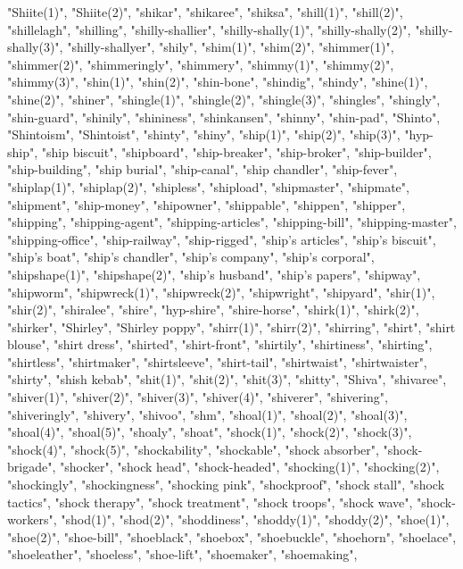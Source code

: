 "Shiite(1)",
"Shiite(2)",
"shikar",
"shikaree",
"shiksa",
"shill(1)",
"shill(2)",
"shillelagh",
"shilling",
"shilly-shallier",
"shilly-shally(1)",
"shilly-shally(2)",
"shilly-shally(3)",
"shilly-shallyer",
"shily",
"shim(1)",
"shim(2)",
"shimmer(1)",
"shimmer(2)",
"shimmeringly",
"shimmery",
"shimmy(1)",
"shimmy(2)",
"shimmy(3)",
"shin(1)",
"shin(2)",
"shin-bone",
"shindig",
"shindy",
"shine(1)",
"shine(2)",
"shiner",
"shingle(1)",
"shingle(2)",
"shingle(3)",
"shingles",
"shingly",
"shin-guard",
"shinily",
"shininess",
"shinkansen",
"shinny",
"shin-pad",
"Shinto",
"Shintoism",
"Shintoist",
"shinty",
"shiny",
"ship(1)",
"ship(2)",
"ship(3)",
"hyp-ship",
"ship biscuit",
"shipboard",
"ship-breaker",
"ship-broker",
"ship-builder",
"ship-building",
"ship burial",
"ship-canal",
"ship chandler",
"ship-fever",
"shiplap(1)",
"shiplap(2)",
"shipless",
"shipload",
"shipmaster",
"shipmate",
"shipment",
"ship-money",
"shipowner",
"shippable",
"shippen",
"shipper",
"shipping",
"shipping-agent",
"shipping-articles",
"shipping-bill",
"shipping-master",
"shipping-office",
"ship-railway",
"ship-rigged",
"ship's articles",
"ship's biscuit",
"ship's boat",
"ship's chandler",
"ship's company",
"ship's corporal",
"shipshape(1)",
"shipshape(2)",
"ship's husband",
"ship's papers",
"shipway",
"shipworm",
"shipwreck(1)",
"shipwreck(2)",
"shipwright",
"shipyard",
"shir(1)",
"shir(2)",
"shiralee",
"shire",
"hyp-shire",
"shire-horse",
"shirk(1)",
"shirk(2)",
"shirker",
"Shirley",
"Shirley poppy",
"shirr(1)",
"shirr(2)",
"shirring",
"shirt",
"shirt blouse",
"shirt dress",
"shirted",
"shirt-front",
"shirtily",
"shirtiness",
"shirting",
"shirtless",
"shirtmaker",
"shirtsleeve",
"shirt-tail",
"shirtwaist",
"shirtwaister",
"shirty",
"shish kebab",
"shit(1)",
"shit(2)",
"shit(3)",
"shitty",
"Shiva",
"shivaree",
"shiver(1)",
"shiver(2)",
"shiver(3)",
"shiver(4)",
"shiverer",
"shivering",
"shiveringly",
"shivery",
"shivoo",
"shm",
"shoal(1)",
"shoal(2)",
"shoal(3)",
"shoal(4)",
"shoal(5)",
"shoaly",
"shoat",
"shock(1)",
"shock(2)",
"shock(3)",
"shock(4)",
"shock(5)",
"shockability",
"shockable",
"shock absorber",
"shock-brigade",
"shocker",
"shock head",
"shock-headed",
"shocking(1)",
"shocking(2)",
"shockingly",
"shockingness",
"shocking pink",
"shockproof",
"shock stall",
"shock tactics",
"shock therapy",
"shock treatment",
"shock troops",
"shock wave",
"shock-workers",
"shod(1)",
"shod(2)",
"shoddiness",
"shoddy(1)",
"shoddy(2)",
"shoe(1)",
"shoe(2)",
"shoe-bill",
"shoeblack",
"shoebox",
"shoebuckle",
"shoehorn",
"shoelace",
"shoeleather",
"shoeless",
"shoe-lift",
"shoemaker",
"shoemaking",
